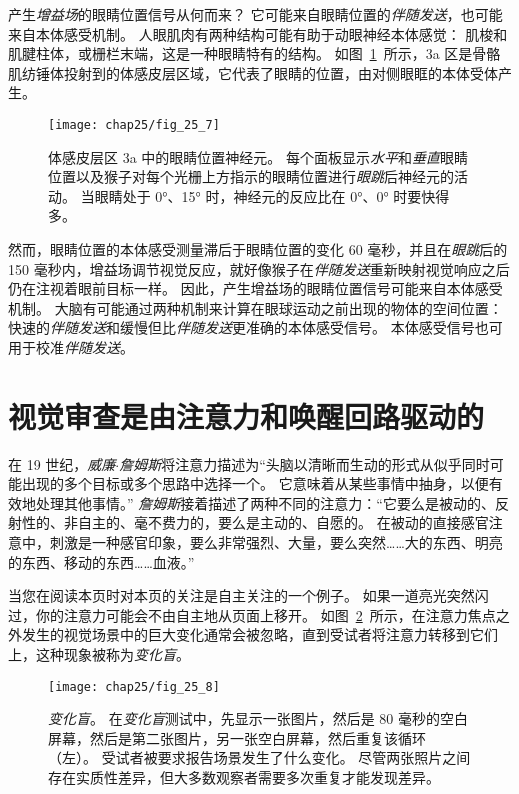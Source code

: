 产生\textit{增益场}的眼睛位置信号从何而来？
它可能来自眼睛位置的\textit{伴随发送}，也可能来自本体感受机制。
人眼肌肉有两种结构可能有助于动眼神经本体感觉：
肌梭和肌腱柱体，或栅栏末端，这是一种眼睛特有的结构。
如图~\ref{fig:25_7}~所示，3a 区是骨骼肌纺锤体投射到的体感皮层区域，它代表了眼睛的位置，由对侧眼眶的本体受体产生。


\begin{figure}[htbp]
	\centering
	\texttt{[image: chap25/fig\_25\_7]}
	\caption{体感皮层区 3a 中的眼睛位置神经元。
		每个面板显示\textit{水平}和\textit{垂直}眼睛位置以及猴子对每个光栅上方指示的眼睛位置进行\textit{眼跳}后神经元的活动。
		当眼睛处于 0°、15° 时，神经元的反应比在 0°、0° 时要快得多。}
	\label{fig:25_7}
\end{figure}


然而，眼睛位置的本体感受测量滞后于眼睛位置的变化 60 毫秒，并且在\textit{眼跳}后的 150 毫秒内，增益场调节视觉反应，就好像猴子在\textit{伴随发送}重新映射视觉响应之后仍在注视着眼前目标一样。
因此，产生增益场的眼睛位置信号可能来自本体感受机制。
大脑有可能通过两种机制来计算在眼球运动之前出现的物体的空间位置：
快速的\textit{伴随发送}和缓慢但比\textit{伴随发送}更准确的本体感受信号。
本体感受信号也可用于校准\textit{伴随发送}。



\section{视觉审查是由注意力和唤醒回路驱动的}

在 19 世纪，\textit{威廉$\cdot$詹姆斯}将注意力描述为“头脑以清晰而生动的形式从似乎同时可能出现的多个目标或多个思路中选择一个。
它意味着从某些事情中抽身，以便有效地处理其他事情。” 
\textit{詹姆斯}接着描述了两种不同的注意力：“它要么是被动的、反射性的、非自主的、毫不费力的，要么是主动的、自愿的。
在被动的直接感官注意中，刺激是一种感官印象，要么非常强烈、大量，要么突然……大的东西、明亮的东西、移动的东西……血液。”


当您在阅读本页时对本页的关注是自主关注的一个例子。
如果一道亮光突然闪过，你的注意力可能会不由自主地从页面上移开。
如图~\ref{fig:25_8}~所示，在注意力焦点之外发生的视觉场景中的巨大变化通常会被忽略，直到受试者将注意力转移到它们上，这种现象被称为\textit{变化盲}。


\begin{figure}[htbp]
	\centering
	\texttt{[image: chap25/fig\_25\_8]}
	\caption{\textit{变化盲}。
		在\textit{变化盲}测试中，先显示一张图片，然后是 80 毫秒的空白屏幕，然后是第二张图片，另一张空白屏幕，然后重复该循环（左）。
		受试者被要求报告场景发生了什么变化。
		尽管两张照片之间存在实质性差异，但大多数观察者需要多次重复才能发现差异。}
	\label{fig:25_8}
\end{figure}


